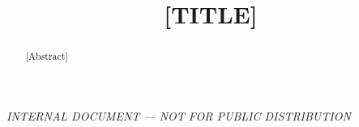 \documentclass{}
\begin{document}

\widetext%
\centerline{\em INTERNAL DOCUMENT --- NOT FOR PUBLIC DISTRIBUTION\/}

\title{[TITLE]}

\begin{abstract}
    [Abstract]%
\end{abstract}
\keywords{[KEYWORDS]}%
\pacs{}%
\maketitle

\lipsum%
\end{document}
